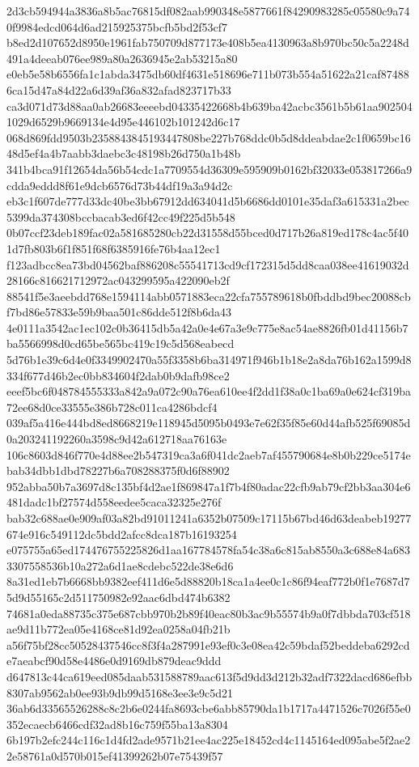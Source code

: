 \documentclass[11pt,a4paper]{article}
\begin{document}
{2d3cb594944a3836a8b5ac76815df082aab990348e5877661f84290983285c05580c9a740f9984edcd064d6ad215925375bcfb5bd2f53cf7
b8ed2d107652d8950e1961fab750709d877173e408b5ea4130963a8b970bc50c5a2248d491a4deeab076ee989a80a2636945e2ab53215a80
e0eb5e58b6556fa1c1abda3475db60df4631e518696e711b073b554a51622a21caf874886ca15d47a84d22a6d39af36a832afad823717b33
ca3d071d73d88aa0ab26683eeeebd04335422668b4b639ba42acbc3561b5b61aa9025041029d6529b9669134e4d95e446102b101242d6c17
068d869fdd9503b2358843845193447808be227b768ddc0b5d8ddeabdae2c1f0659bc1648d5ef4a4b7aabb3daebc3c48198b26d750a1b48b
341b4bca91f12654da56b54cdc1a7709554d36309e595909b0162bf32033e053817266a9cdda9eddd8f61e9dcb6576d73b44df19a3a94d2c
eb3c1f607de777d33dc40be3bb67912dd634041d5b6686dd0101e35daf3a615331a2bec5399da374308bccbacab3ed6f42cc49f225d5b548
0b07ccf23deb189fac02a581685280cb22d31558d55bced0d717b26a819ed178c4ac5f401d7fb803b6f1f851f68f6385916fe76b4aa12ec1
f123adbcc8ea73bd04562baf886208c55541713cd9cf172315d5dd8caa038ee41619032d28166c816621712972ac043299595a422090eb2f
88541f5e3aeebdd768e1594114abb0571883eca22cfa755789618b0fbddbd9bec20088cbf7bd86e57833e59b9baa501c86dde512f8b6da43
4e0111a3542ac1ec102c0b36415db5a42a0e4e67a3e9c775e8ac54ae8826fb01d41156b7ba5566998d0cd65be565bc419c19c5d568eabecd
5d76b1e39c6d4e0f3349902470a55f3358b6ba314971f946b1b18e2a8da76b162a1599d8334f677d46b2ec0bb834604f2dab0b9dafb98ce2
eeef5bc6f048784555333a842a9a072c90a76ea610ee4f2dd1f38a0c1ba69a0e624cf319ba72ee68d0ce33555e386b728c011ca4286bdcf4
039af5a416e444bd8ed8668219e118945d5095b0493e7e62f35f85e60d44afb525f69085d0a203241192260a3598c9d42a612718aa76163e
106c8603d846f770e4d88ee2b547319ca3a6f041dc2aeb7af455790684e8b0b229ce5174ebab34dbb1dbd78227b6a708288375f0d6f88902
952abba50b7a3697d8c135bf4d2ae1f869847a1f7b4f80adac22cfb9ab79cf2bb3aa304e6481dadc1bf27574d558eedee5caca32325e276f
bab32c688ae0e909af03a82bd91011241a6352b07509c17115b67bd46d63deabeb19277674e916c549112dc5bdd2afcc8dca187b16193254
e075755a65ed174476755225826d1aa167784578fa54c38a6c815ab8550a3c688e84a6833307558536b10a272a6d1ae8cdebc522de38e6d6
8a31ed1eb7b6668bb9382eef411d6e5d88820b18ca1a4ee0c1c86f94eaf772b0f1e7687d75d9d55165c2d511750982e92aac6dbd474b6382
74681a0eda88735c375e687cbb970b2b89f40eac80b3ac9b55574b9a0f7dbbda703cf518ae9d11b772ea05e4168ce81d92ea0258a04fb21b
a56f75bf28cc50528437546cc8f3f4a287991e93ef0c3e08ea42c59bdaf52beddeba6292cde7aeabcf90d58e4486e0d9169db879deac9ddd
d647813c44ca619eed085daab531588789aac613f5d9dd3d212b32adf7322dacd686efbb8307ab9562ab0ee93b9db99d5168e3ee3e9c5d21
36ab6d33565526288c8c2b6e0244fa8693cbe6abb85790da1b1717a4471526c7026f55e0352ecaecb6466cdf32ad8b16c759f55ba13a8304
6b197b2efc244c116c1d4fd2ade9571b21ee4ac225e18452cd4c1145164ed095abe5f2ae22e58761a0d570b015ef41399262b07e75439f57
}
\end{document}
